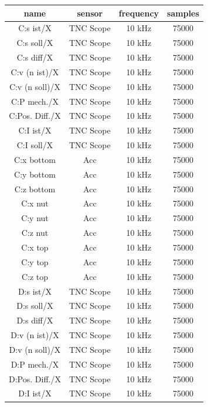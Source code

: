 \begin{center}
\begin{longtable}{||c c c c||} 
 \hline
 name & sensor & frequency & samples \\ [0.5ex] 
 \hline\hline
 C:s ist/X & TNC Scope & 10 kHz & 75000 \\ 
 \hline
 C:s soll/X & TNC Scope & 10 kHz & 75000 \\ 
 \hline
 C:s diff/X & TNC Scope & 10 kHz & 75000 \\ 
 \hline
 C:v (n ist)/X & TNC Scope & 10 kHz & 75000 \\ 
 \hline
 C:v (n soll)/X& TNC Scope & 10 kHz & 75000 \\ 
 \hline
 C:P mech./X & TNC Scope & 10 kHz & 75000 \\ 
 \hline
 C:Pos. Diff./X & TNC Scope & 10 kHz & 75000 \\ 
 \hline
 C:I ist/X & TNC Scope & 10 kHz & 75000 \\ 
  \hline
 C:I soll/X & TNC Scope & 10 kHz & 75000 \\ 
 \hline
 C:x bottom & Acc & 10 kHz & 75000 \\ 
 \hline
 C:y bottom & Acc & 10 kHz & 75000 \\ 
 \hline
 C:z bottom & Acc & 10 kHz & 75000 \\ 
 \hline
 C:x nut & Acc & 10 kHz & 75000 \\ 
 \hline
 C:y nut & Acc & 10 kHz & 75000 \\ 
 \hline
 C:z nut & Acc & 10 kHz & 75000 \\ 
 \hline
  C:x top & Acc & 10 kHz & 75000 \\ 
 \hline
 C:y top & Acc & 10 kHz & 75000 \\ 
 \hline
 C:z top & Acc & 10 kHz & 75000 \\ 
 \hline
 D:s ist/X & TNC Scope & 10 kHz & 75000 \\
 \hline
 D:s soll/X & TNC Scope & 10 kHz & 75000 \\ 
 \hline
 D:s diff/X & TNC Scope & 10 kHz & 75000 \\ 
 \hline
 D:v (n ist)/X & TNC Scope & 10 kHz & 75000 \\ 
 \hline
 D:v (n soll)/X & TNC Scope & 10 kHz & 75000 \\ 
 \hline
 D:P mech./X & TNC Scope & 10 kHz & 75000 \\ 
 \hline
 D:Pos. Diff./X & TNC Scope & 10 kHz & 75000 \\ 
  \hline
 D:I ist/X & TNC Scope & 10 kHz & 75000 \\ 
 \hline

\end{longtable}
\end{center}
